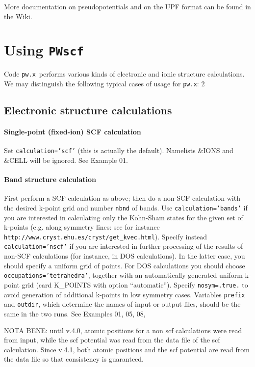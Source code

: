 \documentclass[12pt,a4paper]{article}
\def\pwx{\texttt{pw.x}}
\def\PWscf{\texttt{PWscf}}
\begin{document}
More documentation on pseudopotentials and on the UPF format
can be found in the Wiki.
\section{Using \PWscf}


Code \pwx\ performs various kinds of electronic and ionic structure 
calculations.
We may distinguish the following typical cases of usage for \pwx:
2
\subsection{Electronic structure calculations}
\paragraph{Single-point (fixed-ion) SCF calculation} 
Set \texttt{calculation='scf'} (this is actually the default).
Namelists \&IONS and \&CELL will be ignored. See Example 01.

\paragraph{Band structure calculation}
First perform a SCF calculation as above;
then do a non-SCF calculation with the desired k-point grid and 
number \texttt{nbnd} of bands. 
Use \texttt{calculation='bands'} if you are interested in calculating
only the Kohn-Sham states for the given set of k-points
(e.g. along symmetry lines: see for instance
\texttt{http://www.cryst.ehu.es/cryst/get\_kvec.html}). Specify instead
\texttt{calculation='nscf'} if you are interested in further processing 
of the results of non-SCF calculations (for instance, in DOS calculations).
In the latter case, you should specify a uniform grid of points.
For DOS calculations you should choose \texttt{occupations='tetrahedra'}, 
together with an automatically generated uniform k-point grid 
(card K\_POINTS with option ``automatic'').
Specify \texttt{nosym=.true.} to avoid generation of additional k-points in
low symmetry cases. Variables \texttt{prefix} and \texttt{outdir}, which determine
the names of input or output files, should be the same in the two runs.
See Examples 01, 05, 08,

NOTA BENE: until v.4.0, atomic positions for a non scf calculations 
were read from input, while the scf potential was read from the data file
of the scf calculation. Since v.4.1, both atomic positions and the scf
potential are read from the data file so that consistency is guaranteed.
\end{document}
